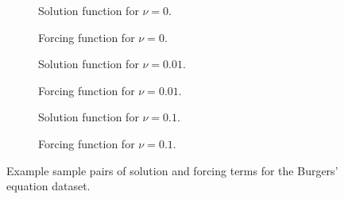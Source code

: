\begin{figure}[H]
  \centering
  \begin{subfigure}{0.49\linewidth}
    \begin{adjustbox}{width=\linewidth}
      
    \end{adjustbox}
    \caption{Solution function for \(\nu=0\).}\label{fig:burgers_solution_0.0}
  \end{subfigure}
  \begin{subfigure}{0.49\linewidth}
    \begin{adjustbox}{width=\linewidth}
      
    \end{adjustbox}
    \caption{Forcing function for \(\nu=0\).}\label{fig:burgers_forcing_0.0}
  \end{subfigure}
  \begin{subfigure}{0.49\linewidth}
    \begin{adjustbox}{width=\linewidth}
      
    \end{adjustbox}
    \caption{Solution function for \(\nu=0.01\).}\label{fig:burgers_solution_0.01}
  \end{subfigure}
  \begin{subfigure}{0.49\linewidth}
    \begin{adjustbox}{width=\linewidth}
      
    \end{adjustbox}
    \caption{Forcing function for \(\nu=0.01\).}\label{fig:burgers_forcing_0.01}
  \end{subfigure}
  \begin{subfigure}{0.49\linewidth}
    \begin{adjustbox}{width=\linewidth}
      
    \end{adjustbox}
    \caption{Solution function for \(\nu=0.1\).}\label{fig:burgers_solution_0.1}
  \end{subfigure}
  \begin{subfigure}{0.49\linewidth}
    \begin{adjustbox}{width=\linewidth}
      
    \end{adjustbox}
    \caption{Forcing function for \(\nu=0.1\).}\label{fig:burgers_forcing_0.1}
  \end{subfigure}
  \caption{Example sample pairs of solution and forcing terms for the Burgers' equation dataset.}\label{fig:burgers_data}
\end{figure}

